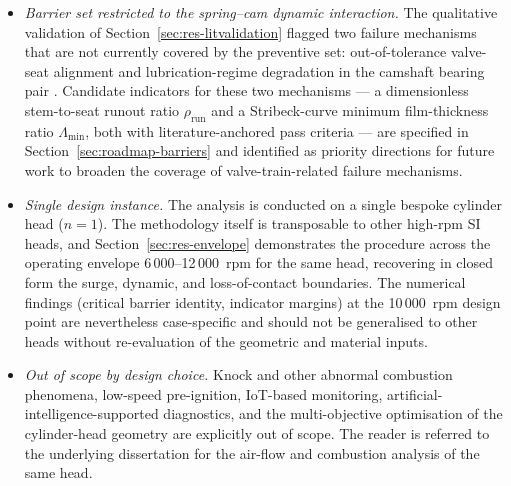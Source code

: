 \begin{itemize}
thermal--structural finite-element analysis of the specific
AP 1.8 cylinder head would refine $L_{\mathrm{Al}}$ and the
localised $\Delta T_{\mathrm{head}}$ field and tighten the
[1.13, 1.60]~mm bracket, but the present deterministic indicator
is no longer a qualitative verification.
\item \emph{Barrier set restricted to the spring--cam dynamic
interaction.} The qualitative validation of
Section~\ref{sec:res-litvalidation} flagged two failure mechanisms
that are not currently covered by the preventive set:
out-of-tolerance valve-seat alignment
\citep{soffritti2018wornvalvetrain} and lubrication-regime
degradation in the camshaft bearing pair
\citep{zhao2023camshaftV6}. Candidate indicators for these two
mechanisms --- a dimensionless stem-to-seat runout ratio
$\rho_{\mathrm{run}}$ and a Stribeck-curve minimum film-thickness
ratio $\Lambda_{\min}$, both with literature-anchored pass
criteria --- are specified in Section~\ref{sec:roadmap-barriers}
and identified as priority directions for future work to broaden the
coverage of valve-train-related failure mechanisms.
\item \emph{Single design instance.} The analysis is conducted on a
single bespoke cylinder head ($n=1$). The methodology itself is
transposable to other high-rpm SI heads, and
Section~\ref{sec:res-envelope} demonstrates the procedure across the
operating envelope 6\,000--12\,000~rpm for the same head, recovering
in closed form the surge, dynamic, and loss-of-contact boundaries.
The numerical findings (critical barrier identity, indicator
margins) at the 10\,000~rpm design point are nevertheless
case-specific and should not be generalised to other heads
without re-evaluation of the geometric and material inputs.
\item \emph{Out of scope by design choice.} Knock and other abnormal
combustion phenomena, low-speed pre-ignition, IoT-based monitoring,
artificial-intelligence-supported diagnostics, and the multi-objective
optimisation of the cylinder-head geometry are explicitly out of scope.
The reader is referred to the underlying dissertation
\citep{porto2026dissertation} for the air-flow and combustion analysis
of the same head.
\end{itemize}
